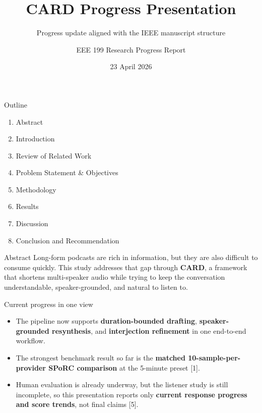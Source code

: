 \documentclass[aspectratio=169,10pt]{beamer}
\title{CARD Progress Presentation}
\subtitle{Progress update aligned with the IEEE manuscript structure}
\author{EEE 199 Research Progress Report}
\institute{University of the Philippines Diliman}
\date{23 April 2026}
\newcommand{\framebibtext}{}
\newcommand{\setframebib}[1]{\gdef\framebibtext{#1}}
\newcommand{\refSPORC}{[1] B.~R. Litterer, D.~Jurgens, and D.~Card, ``Mapping the Podcast Ecosystem with the Structured Podcast Research Corpus,'' in \emph{Proc. 63rd Annu. Meeting Assoc. Comput. Linguistics (Vol. 1: Long Papers)}, Vienna, Austria, 2025, pp.~25132--25154, doi: 10.18653/v1/2025.acl-long.1222.}
\newcommand{\refHumanEval}{[5] ``Human-evaluation response CSV and listener-response log,'' unpublished raw evaluation data, Apr. 2026.}
\begin{document}
\begin{frame}
\setframebib{}
  \vspace{1.1cm}
  {\color{cardblue}\LARGE\inserttitle\par}
  \vspace{0.4cm}
  {\large\insertsubtitle\par}
  \vspace{1.0cm}
  {\large\insertauthor\par}
  \vspace{0.4cm}
  {\normalsize\insertinstitute\par}
  \vspace{0.6cm}
  {\normalsize\insertdate\par}
\end{frame}

\begin{frame}{Outline}
\setframebib{}
\small
\begin{enumerate}
  \item Abstract
  \item Introduction
  \item Review of Related Work
  \item Problem Statement \& Objectives
  \item Methodology
  \item Results
  \item Discussion
  \item Conclusion and Recommendation
\end{enumerate}
\end{frame}

\begin{frame}{Abstract}
\setframebib{\refSPORC\\\refHumanEval}
\small
Long-form podcasts are rich in information, but they are also difficult to consume quickly. This study addresses that gap through \textbf{CARD}, a framework that shortens multi-speaker audio while trying to keep the conversation understandable, speaker-grounded, and natural to listen to.

\vspace{0.5em}
\begin{block}{Current progress in one view}
\begin{itemize}
  \item The pipeline now supports \textbf{duration-bounded drafting}, \textbf{speaker-grounded resynthesis}, and \textbf{interjection refinement} in one end-to-end workflow.
  \item The strongest benchmark result so far is the \textbf{matched 10-sample-per-provider SPoRC comparison} at the 5-minute preset [1].
  \item Human evaluation is already underway, but the listener study is still incomplete, so this presentation reports only \textbf{current response progress and score trends}, not final claims [5].
\end{itemize}
\end{block}
\end{frame}
\end{document}
